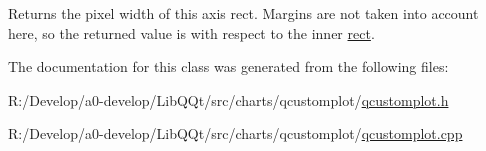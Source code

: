 Returns the pixel width of this axis rect. Margins are not taken into account here, so the returned value is with respect to the inner \mbox{\hyperlink{class_q_c_p_layout_element_a208effccfe2cca4a0eaf9393e60f2dd4}{rect}}. 

The documentation for this class was generated from the following files\+:\begin{DoxyCompactItemize}
\item 
R\+:/\+Develop/a0-\/develop/\+Lib\+Q\+Qt/src/charts/qcustomplot/\mbox{\hyperlink{qcustomplot_8h}{qcustomplot.\+h}}\item 
R\+:/\+Develop/a0-\/develop/\+Lib\+Q\+Qt/src/charts/qcustomplot/\mbox{\hyperlink{qcustomplot_8cpp}{qcustomplot.\+cpp}}\end{DoxyCompactItemize}
